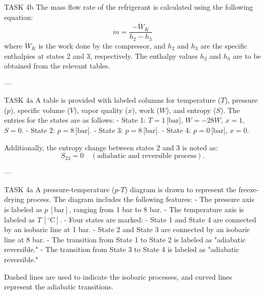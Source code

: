 TASK 4b  
The mass flow rate of the refrigerant is calculated using the following equation:  
\[
\dot{m} = \frac{-\dot{W}_K}{h_2 - h_3}
\]  
where \( \dot{W}_K \) is the work done by the compressor, and \( h_2 \) and \( h_3 \) are the specific enthalpies at states 2 and 3, respectively. The enthalpy values \( h_2 \) and \( h_3 \) are to be obtained from the relevant tables.

---

TASK 4a  
A table is provided with labeled columns for temperature (\( T \)), pressure (\( p \)), specific volume (\( V \)), vapor quality (\( x \)), work (\( W \)), and entropy (\( S \)). The entries for the states are as follows:  
- State 1: \( T = 1 \, \text{[bar]} \), \( W = -28W \), \( x = 1 \), \( S = 0 \).  
- State 2: \( p = 8 \, \text{[bar]} \).  
- State 3: \( p = 8 \, \text{[bar]} \).  
- State 4: \( p = 0 \, \text{[bar]} \), \( x = 0 \).  

Additionally, the entropy change between states 2 and 3 is noted as:  
\[
S_{23} = 0 \quad (\text{adiabatic and reversible process}).
\]

---

TASK 4a  
A pressure-temperature (\( p \)-\( T \)) diagram is drawn to represent the freeze-drying process. The diagram includes the following features:  
- The pressure axis is labeled as \( p \, [\text{bar}] \), ranging from 1 bar to 8 bar.  
- The temperature axis is labeled as \( T \, [^\circ\text{C}] \).  
- Four states are marked:  
  - State 1 and State 4 are connected by an isobaric line at 1 bar.  
  - State 2 and State 3 are connected by an isobaric line at 8 bar.  
  - The transition from State 1 to State 2 is labeled as "adiabatic reversible."  
  - The transition from State 3 to State 4 is labeled as "adiabatic reversible."  

Dashed lines are used to indicate the isobaric processes, and curved lines represent the adiabatic transitions.